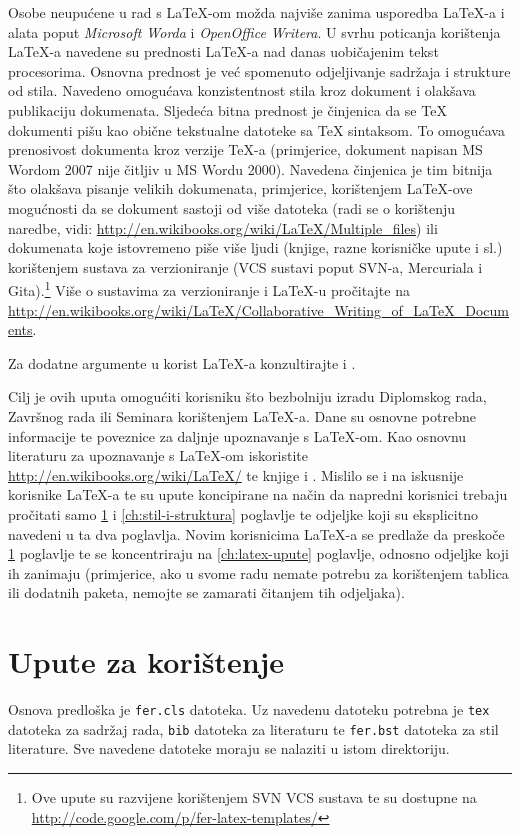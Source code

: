 \documentclass[zavrsni, lmodern, utf8]{fer}
\begin{document}
Osobe neupućene u rad s \LaTeX-om možda najviše zanima usporedba \LaTeX-a i alata
poput \emph{Microsoft Worda} i \emph{OpenOffice Writera}. U svrhu poticanja
korištenja \LaTeX-a navedene su prednosti \LaTeX-a nad danas uobičajenim tekst
procesorima. Osnovna prednost je već spomenuto odjeljivanje sadržaja i strukture
od stila. Navedeno omogućava konzistentnost stila kroz dokument i olakšava
publikaciju dokumenata. Sljedeća bitna prednost je činjenica da se \TeX{}
dokumenti pišu kao obične tekstualne datoteke sa \TeX{} sintaksom. To omogućava
prenosivost dokumenta kroz verzije \TeX-a (primjerice, dokument napisan MS Wordom
2007 nije čitljiv u MS Wordu 2000). Navedena činjenica je tim bitnija što
olakšava pisanje velikih dokumenata, primjerice, korištenjem \LaTeX-ove
mogućnosti da se dokument sastoji od više datoteka (radi se o korištenju
\verb|| naredbe, vidi:
\url{http://en.wikibooks.org/wiki/LaTeX/Multiple_files})
ili dokumenata koje istovremeno piše više ljudi (knjige, razne korisničke upute i
sl.) korištenjem sustava za verzioniranje (VCS sustavi poput SVN-a, Mercuriala i
Gita).\footnote{Ove upute su razvijene korištenjem SVN VCS sustava te su dostupne
na \url{http://code.google.com/p/fer-latex-templates/}} Više o sustavima za
verzioniranje i \LaTeX-u pročitajte na
\url{http://en.wikibooks.org/wiki/LaTeX/Collaborative_Writing_of_LaTeX_Documents}.

Za dodatne argumente u korist \LaTeX-a konzultirajte \citep{taraborelli2009beauty}
i \citep{cottrell1999word}.

Cilj je ovih uputa omogućiti korisniku što bezbolniju izradu Diplomskog rada, Završnog
rada ili Seminara korištenjem \LaTeX-a. Dane su osnovne potrebne informacije te poveznice
za daljnje upoznavanje s \LaTeX-om. Kao osnovnu literaturu za upoznavanje s \LaTeX-om
iskoristite \url{http://en.wikibooks.org/wiki/LaTeX/} te knjige \citep{oetiket2007lshort}
i \citep{ungar2002uvod}. Mislilo se i na iskusnije korisnike \LaTeX-a te su upute koncipirane
na način da napredni korisnici trebaju pročitati samo \ref{ch:upute} i
\ref{ch:stil-i-struktura} poglavlje te odjeljke koji su eksplicitno navedeni u ta dva poglavlja.
Novim korisnicima \LaTeX-a se predlaže da preskoče \ref{ch:upute} poglavlje te se koncentriraju
na \ref{ch:latex-upute} poglavlje, odnosno odjeljke koji ih zanimaju (primjerice, ako
u svome radu nemate potrebu za korištenjem tablica ili dodatnih paketa, nemojte se zamarati
čitanjem tih odjeljaka).


\chapter{Upute za korištenje}
\label{ch:upute}
Osnova predloška je \texttt{fer.cls} datoteka. Uz navedenu datoteku potrebna je
\texttt{tex} datoteka za sadržaj rada, \texttt{bib} datoteka za literaturu te
\texttt{fer.bst} datoteka za stil literature. Sve navedene datoteke moraju se
nalaziti u istom direktoriju.
\end{document}

